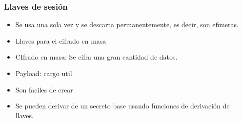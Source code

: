 \documentclass[11pt]{article}
\begin{document}
\subsubsection{Llaves de sesión}
\label{sec:orgb554a99}
\begin{itemize}
\item Se usa una sola vez y se descarta permanentemente, es decir, son efimeras.
\item Llaves para el cifrado en masa
\item CIfrado en masa: Se cifra una gran cantidad de datos.
\item Payload: cargo util
\item Son faciles de crear
\item Se pueden derivar de un secreto base usando funciones de derivación de llaves.
\end{itemize}
\end{document}
